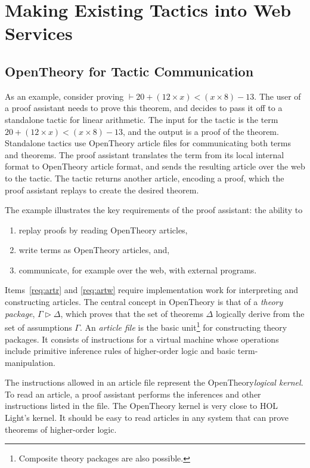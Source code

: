 \documentclass{llncs}
\newcommand{\OpenTheory}{OpenTheory\xspace}
\begin{document}
\section{Making Existing Tactics into Web Services}
\label{sec:implementation}

\subsection{\OpenTheory for Tactic Communication}
As an example, consider proving $\vdash20+(12\times x)<(x\times 8)-13$.
The user of a proof assistant needs to prove this theorem, and decides to pass it off to a standalone tactic for linear arithmetic.
The input for the tactic is the term $20+(12\times x)<(x\times 8)-13$, and the output is a proof of the theorem.
Standalone tactics use \OpenTheory article files for communicating both terms and theorems.
The proof assistant translates the term from its local internal format to \OpenTheory article format, and sends the resulting article over the web to the tactic.
The tactic returns another article, encoding a proof, which the proof assistant replays to create the desired theorem.

The example illustrates the key requirements of the proof assistant: the ability to
\begin{enumerate}
\item \label{req:artr} replay proofs by reading \OpenTheory articles,
\item \label{req:artw} write terms as \OpenTheory articles, and,
\item \label{req:comm} communicate, for example over the web, with external programs.
\end{enumerate}

Items~\ref{req:artr} and \ref{req:artw} require implementation work for interpreting and constructing articles.
The central concept in \OpenTheory is that of a \emph{theory package}, $\Gamma\rhd\Delta$, which proves that the set of theorems $\Delta$ logically derive from the set of assumptions $\Gamma$.
An \emph{article file} is the basic unit\footnote{Composite theory packages are also possible.} for constructing theory packages.
It consists of instructions for a virtual machine whose operations include primitive inference rules of higher-order logic and basic term-manipulation.

The instructions allowed in an article file represent the \OpenTheory \emph{logical kernel}.
To read an article, a proof assistant performs the inferences and other instructions listed in the file.
The \OpenTheory kernel is very close to HOL Light's kernel.
It should be easy to read articles in any system that can prove theorems of higher-order logic.
\end{document}
